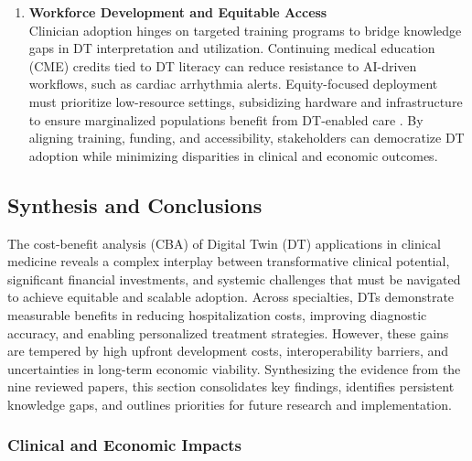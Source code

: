 \documentclass[10pt,a4paper]{article}
\begin{document}
\begin{enumerate}
    \item \textbf{Workforce Development and Equitable Access} \\
    Clinician adoption hinges on targeted training programs to bridge knowledge gaps in DT interpretation and utilization. Continuing medical education (CME) credits tied to DT literacy \cite{Ahmed2023} can reduce resistance to AI-driven workflows, such as cardiac arrhythmia alerts. Equity-focused deployment must prioritize low-resource settings, subsidizing hardware and infrastructure to ensure marginalized populations benefit from DT-enabled care \cite{Wang2025}. By aligning training, funding, and accessibility, stakeholders can democratize DT adoption while minimizing disparities in clinical and economic outcomes.
\end{enumerate}


\subsection*{Synthesis and Conclusions}

The cost-benefit analysis (CBA) of Digital Twin (DT) applications in clinical medicine reveals a complex interplay between transformative clinical potential, significant financial investments, and systemic challenges that must be navigated to achieve equitable and scalable adoption. Across specialties, DTs demonstrate measurable benefits in reducing hospitalization costs, improving diagnostic accuracy, and enabling personalized treatment strategies. However, these gains are tempered by high upfront development costs, interoperability barriers, and uncertainties in long-term economic viability. Synthesizing the evidence from the nine reviewed papers, this section consolidates key findings, identifies persistent knowledge gaps, and outlines priorities for future research and implementation.

\subsubsection*{Clinical and Economic Impacts}
\end{document}
